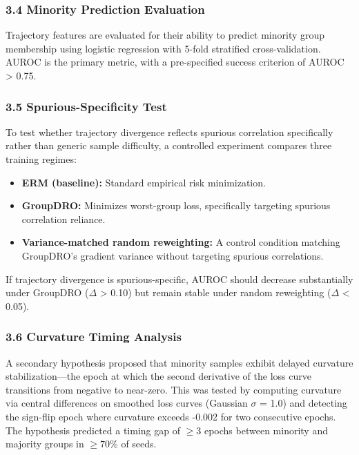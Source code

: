 \subsubsection{3.4 Minority Prediction Evaluation}

Trajectory features are evaluated for their ability to predict minority group membership using logistic regression with 5-fold stratified cross-validation. AUROC is the primary metric, with a pre-specified success criterion of AUROC > 0.75.

\subsubsection{3.5 Spurious-Specificity Test}

To test whether trajectory divergence reflects spurious correlation specifically rather than generic sample difficulty, a controlled experiment compares three training regimes:

\begin{itemize}
\item \textbf{ERM (baseline):} Standard empirical risk minimization.
\item \textbf{GroupDRO:} Minimizes worst-group loss, specifically targeting spurious correlation reliance.
\item \textbf{Variance-matched random reweighting:} A control condition matching GroupDRO's gradient variance without targeting spurious correlations.
\end{itemize}

If trajectory divergence is spurious-specific, AUROC should decrease substantially under GroupDRO ($\Delta$ > 0.10) but remain stable under random reweighting ($\Delta$ < 0.05).

\subsubsection{3.6 Curvature Timing Analysis}

A secondary hypothesis proposed that minority samples exhibit delayed curvature stabilization---the epoch at which the second derivative of the loss curve transitions from negative to near-zero. This was tested by computing curvature via central differences on smoothed loss curves (Gaussian $\sigma$ = 1.0) and detecting the sign-flip epoch where curvature exceeds -0.002 for two consecutive epochs. The hypothesis predicted a timing gap of $\geq 3$ epochs between minority and majority groups in $\geq 70$\% of seeds.
